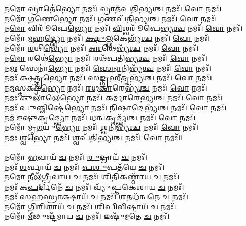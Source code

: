 𑌨\-\ul{𑌮𑍋} 𑌵𑍍𑌰𑌾𑌤𑍇॑\-\ul{𑌭𑍍𑌯𑍋} 𑌨𑌮𑌃᳴। 𑌵𑍍𑌰𑌾𑌤᳴𑌪𑌤𑌿𑌭𑍍𑌯\-\ul{𑌶𑍍𑌚} 𑌨𑌮𑌃᳴। \ul{𑌵𑍋} 𑌨𑌮𑌃᳴। \\
𑌨𑌮𑍋᳴ \ul{𑌗}\-𑌣𑍇\-\ul{𑌭𑍍𑌯𑍋} 𑌨𑌮𑌃᳴। \ul{𑌗}\-𑌣𑌪᳴𑌤𑌿𑌭𑍍𑌯\-\ul{𑌶𑍍𑌚} 𑌨𑌮𑌃᳴। \ul{𑌵𑍋} 𑌨𑌮𑌃᳴।\\
𑌨\-\ul{𑌮𑍋} 𑌵𑌿𑌰𑍂᳴𑌪𑍇\-\ul{𑌭𑍍𑌯𑍋} 𑌨𑌮𑌃᳴। \ul{𑌵𑌿}\-𑌶𑍍𑌵𑌰𑍂᳴𑌪𑍇𑌭𑍍𑌯\-\ul{𑌶𑍍𑌚} 𑌨𑌮𑌃᳴। \ul{𑌵𑍋} 𑌨𑌮𑌃᳴। \\
𑌨𑌮𑍋᳴ \ul{𑌮}\-𑌹\-\ul{𑌦𑍍𑌭𑍍𑌯𑍋} 𑌨𑌮𑌃᳴। \ul{𑌕𑍍𑌷𑍁}\-\-\ul{𑌲𑍍𑌲}\-𑌕𑍇𑌭𑍍𑌯᳴\-\ul{𑌶𑍍𑌚} 𑌨𑌮𑌃᳴। \ul{𑌵𑍋} 𑌨𑌮𑌃᳴।\\
𑌨𑌮𑍋᳴ \ul{𑌰}\-𑌥𑌿\-\ul{𑌭𑍍𑌯𑍋} 𑌨𑌮𑌃᳴। \ul{𑌅}\-\-\ul{𑌰}\-𑌥𑍇𑌭𑍍𑌯᳴\-\ul{𑌶𑍍𑌚} 𑌨𑌮𑌃᳴। \ul{𑌵𑍋} 𑌨𑌮𑌃᳴। \\
𑌨\-\ul{𑌮𑍋} 𑌰𑌥𑍇॑\-\ul{𑌭𑍍𑌯𑍋} 𑌨𑌮𑌃᳴। 𑌰𑌥᳴𑌪𑌤𑌿𑌭𑍍𑌯\-\ul{𑌶𑍍𑌚} 𑌨𑌮𑌃᳴। \ul{𑌵𑍋} 𑌨𑌮𑌃᳴।\\
𑌨\-\ul{𑌮𑌃} 𑌸𑍇𑌨𑌾॑\-\ul{𑌭𑍍𑌯𑍋} 𑌨𑌮𑌃᳴। \ul{𑌸𑍇}\-\-\ul{𑌨𑌾}\-𑌨𑌿𑌭𑍍𑌯᳴\-\ul{𑌶𑍍𑌚} 𑌨𑌮𑌃᳴। \ul{𑌵𑍋} 𑌨𑌮𑌃᳴। \\
𑌨𑌮𑌃᳴ \ul{𑌕𑍍𑌷}\-𑌤𑍍𑌤𑍃\-\ul{𑌭𑍍𑌯𑍋} 𑌨𑌮𑌃᳴। \ul{𑌸}\-\-\ul{𑌙𑍍𑌗𑍍𑌰}\-\-\ul{𑌹𑍀}\-𑌤𑍃𑌭𑍍𑌯᳴\-\ul{𑌶𑍍𑌚} 𑌨𑌮𑌃᳴। \ul{𑌵𑍋} 𑌨𑌮𑌃᳴। \\
𑌨\-\ul{𑌮}\-𑌸𑍍𑌤𑌕𑍍𑌷᳴\-\ul{𑌭𑍍𑌯𑍋} 𑌨𑌮𑌃᳴। \ul{𑌰}\-\-\ul{𑌥}\-\-\ul{𑌕𑌾}\-𑌰𑍇𑌭𑍍𑌯᳴\-\ul{𑌶𑍍𑌚} 𑌨𑌮𑌃᳴। \ul{𑌵𑍋} 𑌨𑌮𑌃᳴। \\
𑌨\-\ul{𑌮𑌃} 𑌕𑍁𑌲𑌾᳴𑌲𑍇\-\ul{𑌭𑍍𑌯𑍋} 𑌨𑌮𑌃᳴। \ul{𑌕}\-𑌰𑍍𑌮𑌾𑌰𑍇॑𑌭𑍍𑌯\-\ul{𑌶𑍍𑌚} 𑌨𑌮𑌃᳴। \ul{𑌵𑍋} 𑌨𑌮𑌃᳴। \\
𑌨𑌮𑌃᳴ \ul{𑌪𑍁}\-𑌞𑍍𑌜𑌿𑌷𑍍𑌟𑍇॑\-\ul{𑌭𑍍𑌯𑍋} 𑌨𑌮𑌃᳴। \ul{𑌨𑌿}\-\-\ul{𑌷𑌾}\-𑌦𑍇𑌭𑍍𑌯᳴\-\ul{𑌶𑍍𑌚} 𑌨𑌮𑌃᳴। \ul{𑌵𑍋} 𑌨𑌮𑌃᳴। \\
𑌨𑌮᳴ 𑌇\-\ul{𑌷𑍁}\-𑌕𑍃\-\ul{𑌦𑍍𑌭𑍍𑌯𑍋} 𑌨𑌮𑌃᳴। \ul{𑌧}\-\-\ul{𑌨𑍍𑌵}\-𑌕𑍃𑌦𑍍𑌭𑍍𑌯᳴\-\ul{𑌶𑍍𑌚} 𑌨𑌮𑌃᳴। \ul{𑌵𑍋} 𑌨𑌮𑌃᳴।\\
𑌨𑌮𑍋᳴ 𑌮𑍃\-\ul{𑌗}\-𑌯𑍁\-\ul{𑌭𑍍𑌯𑍋} 𑌨𑌮𑌃᳴। \ul{𑌶𑍍𑌵}\-𑌨𑌿𑌭𑍍𑌯᳴\-\ul{𑌶𑍍𑌚} 𑌨𑌮𑌃᳴। \ul{𑌵𑍋} 𑌨𑌮𑌃᳴। \\
𑌨\-\ul{𑌮𑌃} 𑌶𑍍𑌵\-\ul{𑌭𑍍𑌯𑍋} 𑌨𑌮𑌃᳴। 𑌶𑍍𑌵𑌪᳴𑌤𑌿𑌭𑍍𑌯\-\ul{𑌶𑍍𑌚} 𑌨𑌮𑌃᳴। \ul{𑌵𑍋} 𑌨𑌮𑌃᳴॥ \\
\\
𑌨𑌮𑍋᳴ \ul{𑌭}\-𑌵𑌾𑌯᳴ \ul{𑌚} 𑌨𑌮𑌃᳴। \ul{𑌰𑍁}\-𑌦𑍍𑌰𑌾𑌯᳴ \ul{𑌚} 𑌨𑌮𑌃᳴। \\
𑌨𑌮𑌃᳴ \ul{𑌶}\-𑌰𑍍𑌵𑌾𑌯᳴ \ul{𑌚} 𑌨𑌮𑌃᳴। \ul{𑌪}\-\-\ul{𑌶𑍁}\-𑌪𑌤᳴𑌯𑍇 \ul{𑌚} 𑌨𑌮𑌃᳴।\\
𑌨\-\ul{𑌮𑍋} 𑌨𑍀𑌲᳴𑌗𑍍𑌰𑍀𑌵𑌾𑌯 \ul{𑌚} 𑌨𑌮𑌃᳴। \ul{𑌶𑌿}\-\-\ul{𑌤𑌿}\-𑌕𑌣𑍍𑌠𑌾᳴𑌯 \ul{𑌚} 𑌨𑌮𑌃᳴। \\
𑌨𑌮𑌃᳴ 𑌕\-\ul{𑌪}\-𑌰𑍍𑌦𑌿𑌨𑍇᳴ \ul{𑌚} 𑌨𑌮𑌃᳴। 𑌵𑍍𑌯𑍁᳴𑌪𑍍𑌤𑌕𑍇𑌶𑌾𑌯 \ul{𑌚} 𑌨𑌮𑌃᳴।\\
𑌨𑌮𑌃᳴ 𑌸𑌹\-\ul{𑌸𑍍𑌰𑌾}\-𑌕𑍍𑌷𑌾𑌯᳴ \ul{𑌚} 𑌨𑌮𑌃᳴। \ul{𑌶}\-𑌤𑌧᳴𑌨𑍍𑌵𑌨𑍇 \ul{𑌚} 𑌨𑌮𑌃᳴। \\
𑌨𑌮𑍋᳴ 𑌗𑌿\-\ul{𑌰𑌿}\-𑌶𑌾𑌯᳴ \ul{𑌚} 𑌨𑌮𑌃᳴। \ul{𑌶𑌿}\-\-\ul{𑌪𑌿}\-\-\ul{𑌵𑌿}\-𑌷𑍍𑌟𑌾𑌯᳴ \ul{𑌚} 𑌨𑌮𑌃᳴।\\
𑌨𑌮𑍋᳴ \ul{𑌮𑍀}\-𑌢𑍁𑌷𑍍𑌟᳴𑌮𑌾𑌯 \ul{𑌚} 𑌨𑌮𑌃᳴। 𑌇𑌷𑍁᳴𑌮𑌤𑍇 \ul{𑌚} 𑌨𑌮𑌃᳴। \\

